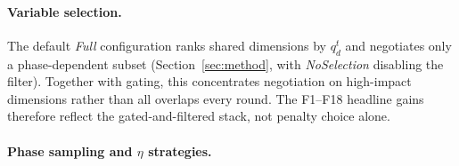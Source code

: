 \documentclass[conference]{IEEEtran}
\begin{document}
\paragraph{Variable selection.} The default \emph{Full} configuration ranks shared dimensions by $q_d^t$ and negotiates only a phase-dependent subset (Section~\ref{sec:method}, with \emph{NoSelection} disabling the filter). Together with gating, this concentrates negotiation on high-impact dimensions rather than all overlaps every round. The F1--F18 headline gains therefore reflect the gated-and-filtered stack, not penalty choice alone.

\paragraph{Phase sampling and $\eta$ strategies.}
\end{document}
